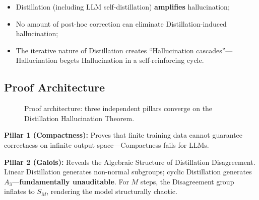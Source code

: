 \documentclass[12pt,a4paper]{article}
\theoremstyle{remark}
\begin{document}
\begin{itemize}[itemsep=3pt]
    \item Distillation (including LLM self-distillation) \textbf{amplifies} hallucination;
    \item No amount of post-hoc correction can eliminate Distillation-induced hallucination;
    \item The iterative nature of Distillation creates ``Hallucination cascades''---Hallucination begets Hallucination in a self-reinforcing cycle.
\end{itemize}

\subsection{Proof Architecture}
\begin{figure}[H]
\centering
{}
\caption{Proof architecture: three independent pillars converge on the Distillation Hallucination Theorem.}\label{fig:triple_proof}
\end{figure}

\textbf{Pillar 1 (Compactness):} Proves that finite training data cannot guarantee correctness on infinite output space---Compactness fails for LLMs.

\textbf{Pillar 2 (Galois):} Reveals the Algebraic Structure of Distillation Disagreement. Linear Distillation generates non-normal subgroups; cyclic Distillation generates \(A_3\)---\textbf{fundamentally unauditable}. For \(M\) steps, the Disagreement group inflates to \(S_M\), rendering the model structurally chaotic.
\end{document}
